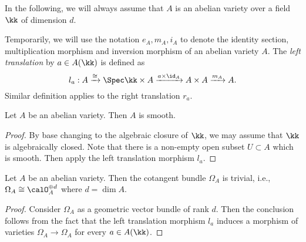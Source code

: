         

        

    In the following, we will always assume that \(A\) is an abelian variety over a field \(\kk\) of dimension \(d\).

    Temporarily, we will use the notation \(e_A,m_A,i_A\) to denote the identity section, multiplication morphism and inversion morphism of an abelian variety \(A\).
    The \emph{left translation} by \(a \in A(\kk)\) is defined as
    \[ l_a: A \xrightarrow{\cong} \Spec \kk \times A \xrightarrow{a \times \id_A} A \times A \xrightarrow{m_A} A. \]
    Similar definition applies to the right translation \(r_a\).

    \begin{proposition}\label{prop: abelian varieties are smooth}
        Let \( A \) be an abelian variety. 
        Then \( A \) is smooth.
    \end{proposition}
    \begin{proof}
        By base changing to the algebraic closure of \(\kk\), we may assume that \(\kk\) is algebraically closed.
        Note that there is a non-empty open subset \(U\subset A\) which is smooth.
        Then apply the left translation morphism \(l_a\).
    \end{proof}

    \begin{proposition}\label{prop: abelian varieties have trivial cotangent bundle}
        Let \( A \) be an abelian variety.
        Then the cotangent bundle \( \Omega_A \) is trivial, i.e., \(\Omega_A \cong \calO_A^{\oplus d}\) where \(d = \dim A\).
    \end{proposition}
    \begin{proof}
        Consider \(\Omega_A\) as a geometric vector bundle of rank \(d\).
        Then the conclusion follows from the fact that the left translation morphism \(l_a\) induces a morphism of varieties \(\Omega_A \to \Omega_A\) for every \(a \in A(\kk)\).
    \end{proof}

